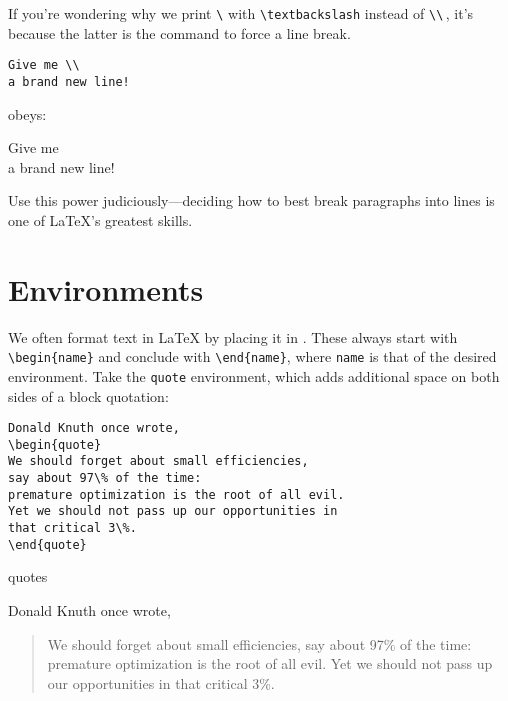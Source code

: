 If you're wondering why we print \texttt{\textbackslash} with
\verb|\textbackslash| instead of \verb|\\|\,,
it's because the latter is the command to force a line break.
\begin{leftfigure}
\begin{lstlisting}
Give me \\
a brand new line!
\end{lstlisting}
\end{leftfigure}
obeys:
\begin{leftfigure}
\lm Give me \\
a brand new line!
\end{leftfigure}
Use this power judiciously---deciding how to best break paragraphs into lines
is one of \LaTeX{}'s greatest skills.

\section{Environments}

We often format text in \LaTeX{} by placing it in .
These always start with \verb|\begin{name}| and conclude with \verb|\end{name}|,
where \texttt{name} is that of the desired environment.
Take the \texttt{quote} environment,
which adds additional space on both sides of a block quotation:
\begin{leftfigure}
\begin{lstlisting}
Donald Knuth once wrote,
\begin{quote}
We should forget about small efficiencies,
say about 97\% of the time:
premature optimization is the root of all evil.
Yet we should not pass up our opportunities in
that critical 3\%.
\end{quote}
\end{lstlisting}
\end{leftfigure}
quotes
\begin{leftfigure}
\lm
Donald Knuth once wrote,
\begin{quote}
We should forget about small efficiencies,
say about 97\% of the time:
premature optimization is the root of all evil.
Yet we should not pass up our opportunities in
that critical 3\%.
\end{quote}
\end{leftfigure}

